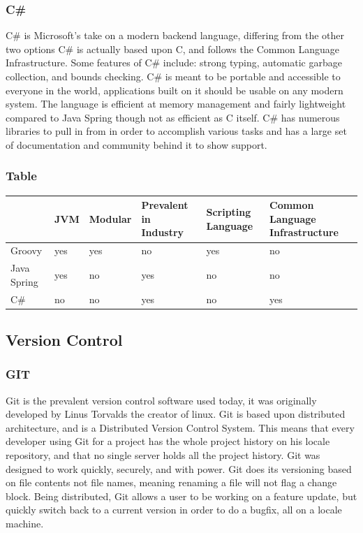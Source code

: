 \documentclass[onecolumn, draftclsnofoot,10pt, compsoc]{IEEEtran}
\begin{document}
\subsubsection{C\#}
    C\# is Microsoft's take on a modern backend language, differing from the other two options C\# is actually based upon C, and follows the Common Language Infrastructure. Some features of C\# include: strong typing, automatic garbage collection, and bounds checking. C\# is meant to be portable and accessible to everyone in the world, applications built on it should be usable on any modern system. The language is efficient at memory management and fairly lightweight compared to Java Spring though not as efficient as C itself. C\# has numerous libraries to pull in from in order to accomplish various tasks and has a large set of documentation and community behind it to show support.

\subsubsection{Table}
\begin{table}[h]
\begin{tabular}{|l|l|l|l|l|l|}
\hline
            & JVM & Modular & Prevalent in Industry & Scripting Language & Common Language Infrastructure \\ \hline
Groovy      & yes & yes     & no                    & yes                & no                             \\ \hline
Java Spring & yes & no      & yes                   & no                 & no                             \\ \hline
C\#         & no  & no      & yes                   & no                 & yes                            \\ \hline
\end{tabular}
\end{table}
\subsection{Version Control}
\subsubsection{GIT}
    Git is the prevalent version control software used today, it was originally developed by Linus Torvalds the creator of linux. Git is based upon distributed architecture, and is a Distributed Version Control System. This means that every developer using Git for a project has the whole project history on his locale repository, and that no single server holds all the project history. Git was designed to work quickly, securely, and with power. Git does its versioning based on file contents not file names, meaning renaming a file will not flag a change block. Being distributed, Git allows a user to be working on a feature update, but quickly switch back to a current version in order to do a bugfix, all on a locale machine.
\end{document}
